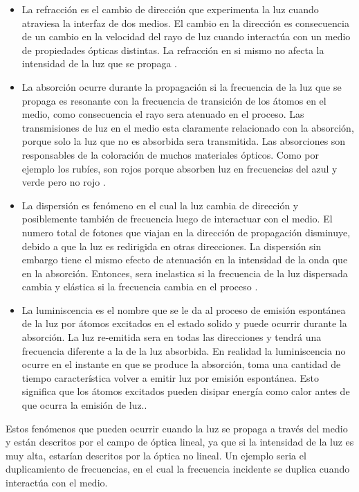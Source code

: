 \documentclass[a4paper,openright,12pt]{book}
\begin{document}
\begin{itemize}
\item La refracción es el cambio de dirección que experimenta la luz cuando atraviesa la interfaz de dos medios. El cambio en la dirección es consecuencia de un cambio en la velocidad del rayo de luz cuando interactúa con un medio de propiedades ópticas distintas. La refracción en si mismo no afecta la intensidad de la luz que se propaga \cite{MarkFox}.

\item La absorción ocurre durante la propagación si la frecuencia de la luz que se propaga es resonante con la frecuencia de transición de los átomos en el medio, como consecuencia el rayo sera atenuado en el proceso. Las transmisiones de luz en el medio esta claramente relacionado con la absorción, porque solo la luz que no es absorbida sera transmitida. Las absorciones son responsables de la coloración de muchos materiales ópticos. Como por ejemplo los rubíes, son rojos porque absorben luz en frecuencias del azul y verde pero no rojo \cite{MarkFox}.

\item La dispersión es fenómeno en el cual la luz cambia de dirección y posiblemente también de frecuencia luego de interactuar con el medio. El numero total de fotones que viajan en la dirección de propagación disminuye, debido a que la luz es redirigida en otras direcciones. La dispersión sin embargo tiene el mismo efecto de atenuación en la intensidad de la onda que en la absorción. Entonces, sera inelastica si la frecuencia de la luz dispersada cambia y elástica si la frecuencia cambia en el proceso \cite{MarkFox}.

\item La luminiscencia es el nombre que se le da al proceso de emisión espontánea de la luz por átomos excitados en el estado solido y puede ocurrir durante la absorción. La luz re-emitida sera en todas las direcciones y tendrá una frecuencia diferente a la de la luz absorbida. En realidad la luminiscencia no ocurre en el instante en que se produce la absorción, toma una cantidad de tiempo característica volver a emitir luz por emisión espontánea. Esto significa que los átomos excitados pueden disipar energía como calor antes de que ocurra la emisión de luz.\cite{MarkFox}.
\end{itemize}

Estos fenómenos que pueden ocurrir cuando la luz se propaga a través del medio y están descritos por el campo de óptica lineal, ya que si la intensidad de la luz es muy alta, estarían descritos por la óptica no lineal. Un ejemplo seria el duplicamiento de frecuencias, en el cual la frecuencia incidente se duplica cuando interactúa con el medio.
\end{document}
